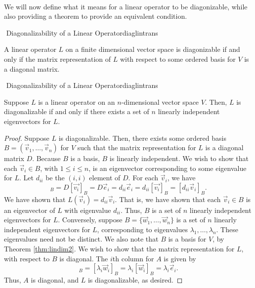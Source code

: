         \\
        We will now define what it means for a linear operator to be diagonizable, while also providing a theorem to provide an equivalent condition.
        \begin{definition}{\Stop\,\,Diagonalizability of a Linear Operator}{diaglintrans}

            A linear operator \(L\) on a finite dimensional vector space is diagonizable if and only if the matrix representation of \(L\) with respect to some ordered basis for \(V\) is a diagonal matrix.
            
        \end{definition}
        \pagebreak
        \begin{theorem}{\Stop\,\,Diagonalizability of a Linear Operator}{diaglintrans}

            Suppose \(L\) is a linear operator on an \(n\)-dimensional vector space \(V\). Then, \(L\) is diagonalizable if and only if there exists a set of \(n\) linearly independent eigenvectors for \(L\).
            \begin{proof}
                Suppose \(L\) is diagonalizable. Then, there exists some ordered basis \(B=(\vec{v}_1,\ldots,\vec{v}_n)\) for \(V\) such that the matrix representation for \(L\) is a diagonal matrix \(D\). Because \(B\) is a basis, \(B\) is linearly independent. We wish to show that each \(\vec{v}_i\in B\), with \(1\leq i\leq n\), is an eigenvector corresponding to some eigenvalue for \(L\). Let \(d_{ii}\) be the \((i,i)\) element of \(D\). For each \(\vec{v}_i\), we have
                \begin{equation*}
                    [L(\vec{v_i})]_B=D[\vec{v_i}]_B=D\vec{e}_i=d_{ii}\vec{e}_i=d_{ii}[\vec{v_i}]_B=[d_{ii}\vec{v}_i]_B.
                \end{equation*}
                We have shown that \(L(\vec{v}_i)=d_{ii}\vec{v}_i\). That is, we have shown that each \(\vec{v}_i\in B\) is an eigenvector of \(L\) with eigenvalue \(d_{ii}\). Thus, \(B\) is a set of \(n\) linearly independent eigenvectors for \(L\). Conversely, suppose \(B=\{\vec{w}_1,\ldots,\vec{w}_n\}\) is a set of \(n\) linearly independent eigenvectors for \(L\), corresponding to eigenvalues \(\lambda_1,\ldots,\lambda_n\). These eigenvalues need not be distinct. We also note that \(B\) is a basis for \(V\), by Theorem \ref{thm:lindim2}. We wish to show that the matrix representation for \(L\), with respect to \(B\) is diagonal. The \(i\)th column for \(A\) is given by
                \begin{equation*}
                    [L(\vec{w}_i)]_B=[\lambda_i\vec{w}_i]_B=\lambda_i[\vec{w}_i]_B=\lambda_i\vec{e}_i.
                \end{equation*}
                Thus, \(A\) is diagonal, and \(L\) is diagonalizable, as desired.
            \end{proof}

        \end{theorem}
